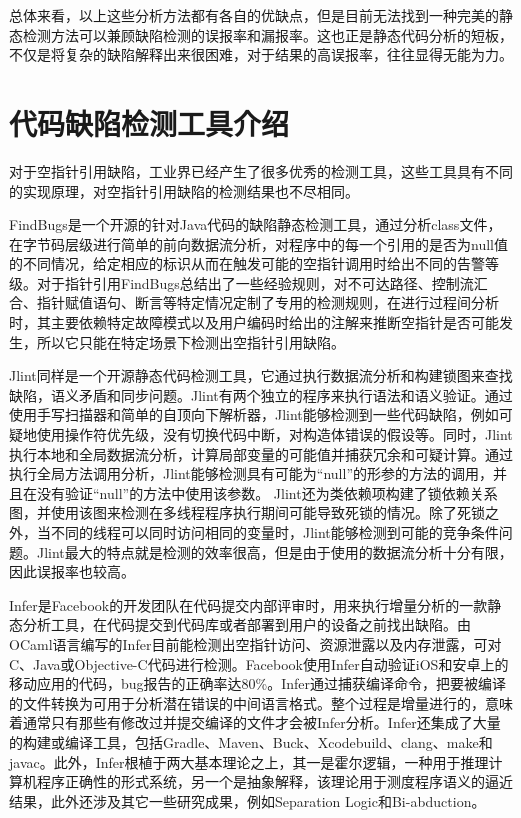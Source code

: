 总体来看，以上这些分析方法都有各自的优缺点，但是目前无法找到一种完美的静态检测方法可以兼顾缺陷检测的误报率和漏报率。这也正是静态代码分析的短板，不仅是将复杂的缺陷解释出来很困难，对于结果的高误报率，往往显得无能为力。

\section{代码缺陷检测工具介绍}
对于空指针引用缺陷，工业界已经产生了很多优秀的检测工具，这些工具具有不同的实现原理，对空指针引用缺陷的检测结果也不尽相同。

FindBugs\cite{hovemeyer2005evaluating}\cite{hovemeyer2007finding}是一个开源的针对Java代码的缺陷静态检测工具，通过分析class文件，在字节码层级进行简单的前向数据流分析，对程序中的每一个引用的是否为null值的不同情况，给定相应的标识从而在触发可能的空指针调用时给出不同的告警等级。对于指针引用FindBugs总结出了一些经验规则，对不可达路径、控制流汇合、指针赋值语句、断言等特定情况定制了专用的检测规则，在进行过程间分析时，其主要依赖特定故障模式以及用户编码时给出的注解来推断空指针是否可能发生，所以它只能在特定场景下检测出空指针引用缺陷。

Jlint同样是一个开源静态代码检测工具，它通过执行数据流分析和构建锁图来查找缺陷，语义矛盾和同步问题。Jlint有两个独立的程序来执行语法和语义验证。通过使用手写扫描器和简单的自顶向下解析器，Jlint能够检测到一些代码缺陷，例如可疑地使用操作符优先级，没有切换代码中断，对构造体错误的假设等。同时，Jlint执行本地和全局数据流分析，计算局部变量的可能值并捕获冗余和可疑计算。通过执行全局方法调用分析，Jlint能够检测具有可能为“null”的形参的方法的调用，并且在没有验证“null”的方法中使用该参数。 Jlint还为类依赖项构建了锁依赖关系图，并使用该图来检测在多线程程序执行期间可能导致死锁的情况。除了死锁之外，当不同的线程可以同时访问相同的变量时，Jlint能够检测到可能的竞争条件问题。Jlint最大的特点就是检测的效率很高，但是由于使用的数据流分析十分有限，因此误报率也较高。

Infer是Facebook的开发团队在代码提交内部评审时，用来执行增量分析的一款静态分析工具，在代码提交到代码库或者部署到用户的设备之前找出缺陷。由OCaml语言编写的Infer目前能检测出空指针访问、资源泄露以及内存泄露，可对C、Java或Objective-C代码进行检测。Facebook使用Infer自动验证iOS和安卓上的移动应用的代码，bug报告的正确率达80\%。Infer通过捕获编译命令，把要被编译的文件转换为可用于分析潜在错误的中间语言格式。整个过程是增量进行的，意味着通常只有那些有修改过并提交编译的文件才会被Infer分析。Infer还集成了大量的构建或编译工具，包括Gradle、Maven、Buck、Xcodebuild、clang、make和javac。此外，Infer根植于两大基本理论之上，其一是霍尔逻辑，一种用于推理计算机程序正确性的形式系统，另一个是抽象解释，该理论用于测度程序语义的逼近结果，此外还涉及其它一些研究成果，例如Separation Logic和Bi-abduction。

